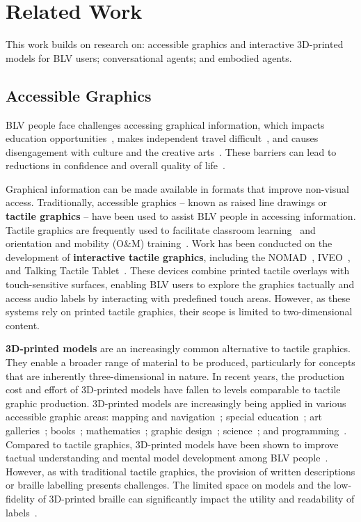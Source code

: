 \section{Related Work}
This work builds on research on: accessible graphics and interactive 3D-printed models for BLV users; conversational agents; and embodied agents.

\subsection{Accessible Graphics}
BLV people face challenges accessing graphical information, which impacts education opportunities~\cite{butler2017understanding}, makes independent travel difficult~\cite{Sheffield2016}, and causes disengagement with culture and the creative arts~\cite{Bartlett2019}. These barriers can lead to reductions in confidence and overall quality of life~\cite{Keeffe2005}.

Graphical information can be made available in formats that improve non-visual access. Traditionally, accessible graphics -- known as raised line drawings or \textbf{tactile graphics} -- have been used to assist BLV people in accessing information. Tactile graphics are frequently used to facilitate classroom learning~\cite{Aldrich2001,Rosenblum2015} and orientation and mobility (O\&M) training~\cite{Blades1999,Rowell2005}. Work has been conducted on the development of \textbf{interactive tactile graphics}, including the NOMAD~\cite{NOMAD}, IVEO~\cite{IVEO}, and Talking Tactile Tablet~\cite{Miele2006,TTT}. These devices combine printed tactile overlays with touch-sensitive surfaces, enabling BLV users to explore the graphics tactually and access audio labels by interacting with predefined touch areas. However, as these systems rely on printed tactile graphics, their scope is limited to two-dimensional content.

\textbf{3D-printed models} are an increasingly common alternative to tactile graphics. They enable a broader range of material to be produced, particularly for concepts that are inherently three-dimensional in nature. In recent years, the production cost and effort of 3D-printed models have fallen to levels comparable to tactile graphic production. 3D-printed models are increasingly being applied in various accessible graphic areas: mapping and navigation~\cite{gual2012visual,Holloway2018,Holloway2019b,Holloway2022,Nagassa2023}; special education~\cite{Buehler2016}; art galleries~\cite{karaduman2022beyond,Butler2023}; books~\cite{kim2015,Stangl2015}; mathematics~\cite{Brown2012,Hu2015}; graphic design~\cite{McDonald2014}; science~\cite{wedler2012applied,Hasper2015}; and programming~\cite{kane2014}. Compared to tactile graphics, 3D-printed models have been shown to improve tactual understanding and mental model development among BLV people~\cite{Holloway2018}. However, as with traditional tactile graphics, the provision of written descriptions or braille labelling presents challenges. The limited space on models and the low-fidelity of 3D-printed braille can significantly impact the utility and readability of labels~\cite{Brown2012,Taylor2015,Shi2016}.


